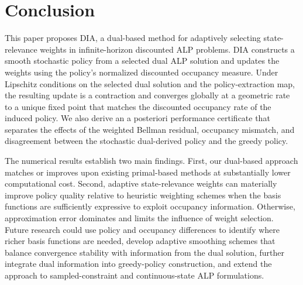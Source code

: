 \documentclass[sglanonrev]{informs4}
\def\edits#1{{\color{black}#1}}
\begin{document}
\section{Conclusion}
\label{sec:conclusion}

This paper proposes \ac{DIA}, a dual-based method for adaptively selecting state-relevance weights in infinite-horizon discounted \ac{ALP} problems. \ac{DIA} constructs a smooth stochastic policy from a selected dual \ac{ALP} solution and updates the weights using the policy's normalized discounted occupancy measure. Under Lipschitz conditions on the selected dual solution and the policy-extraction map, the resulting update is a contraction and converges globally at a geometric rate to a unique fixed point that matches the discounted occupancy rate of the induced policy. We also derive an a posteriori performance certificate that separates the effects of the weighted Bellman residual, occupancy mismatch, and disagreement between the stochastic dual-derived policy and the greedy policy.

\edits{The numerical results establish two main findings. First, our dual-based approach matches or improves upon existing primal-based methods at substantially lower computational cost. Second, adaptive state-relevance weights can materially improve policy quality relative to heuristic weighting schemes when the basis functions are sufficiently expressive to exploit occupancy information. Otherwise, approximation error dominates and limits the influence of weight selection. Future research could use policy and occupancy differences to identify where richer basis functions are needed, develop adaptive smoothing schemes that balance convergence stability with information from the dual solution, further integrate dual information into greedy-policy construction, and extend the approach to sampled-constraint and continuous-state \ac{ALP} formulations.}

\end{document}

